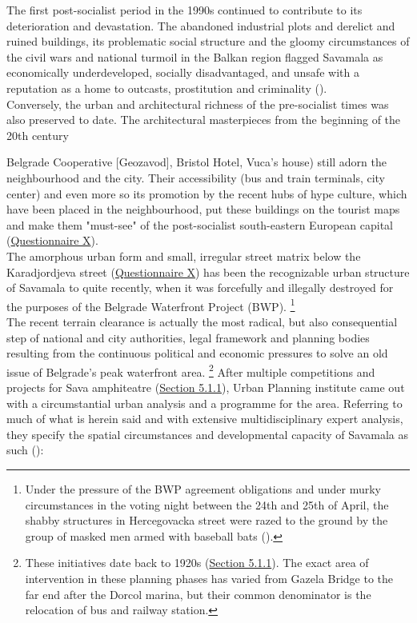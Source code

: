 \documentclass[11pt]{report}
\begin{document}
The first post-socialist period in the 1990s continued to contribute to its deterioration and devastation. The abandoned industrial plots and derelict and ruined buildings, its problematic social structure and the gloomy circumstances of the  civil wars and national turmoil in the Balkan region flagged Savamala as economically underdeveloped, socially disadvantaged, and unsafe with a reputation as a home to outcasts, prostitution and criminality (\cite{CvetinovicEtAl.2013}).
\\

Conversely, the urban and architectural richness of the pre-socialist times was also preserved to date.
The architectural masterpieces from the beginning of the 20th century {Belgrade Cooperative [Geozavod], Bristol Hotel, Vuca's house) still adorn the neighbourhood and the city.
Their accessibility (bus and train terminals, city center) and even more so its promotion by the recent hubs of hype culture, which have been placed in the neighbourhood, put these buildings on the tourist maps and make them "must-see" of the post-socialist south-eastern European capital (\href{Questionnaire Experts Savamala}{Questionnaire X}).
\\

The amorphous urban form and small, irregular street matrix below the Karadjordjeva street (\href{Questionnaire PhD students}{Questionnaire X}) has been the recognizable urban structure of Savamala to quite recently, when it was forcefully and illegally destroyed for the purposes of the Belgrade Waterfront Project (BWP).
\footnote{Under the pressure of the BWP agreement obligations and under murky circumstances in the voting night between the 24th and 25th of April, the shabby structures in Hercegovacka street were razed to the ground by the group of masked men armed with baseball bats (\cite{PopovicAndKovacevic2017}).} %
\\

The recent terrain clearance is actually the most radical, but also consequential step of national and city authorities, legal framework and planning bodies resulting from the continuous political and economic pressures to solve an old issue of Belgrade’s peak waterfront area.
\footnote{These initiatives date back to 1920s (\href{Section 5.1.1}{Section 5.1.1}).
The exact area of intervention in these planning phases has varied from Gazela Bridge to the far end after the Dorcol marina, but their common denominator is the relocation of bus and railway station.}
After multiple competitions and projects for Sava amphiteatre (\href{Section 5.1.1}{Section 5.1.1}), Urban Planning institute came out with a circumstantial urban analysis and a programme for the area.
Referring to much of what is herein said and with extensive multidisciplinary expert analysis, they specify the spatial circumstances and developmental capacity of Savamala as such (\cite{UrbanistickiZavodBeograd2008}):

}
\end{document}
